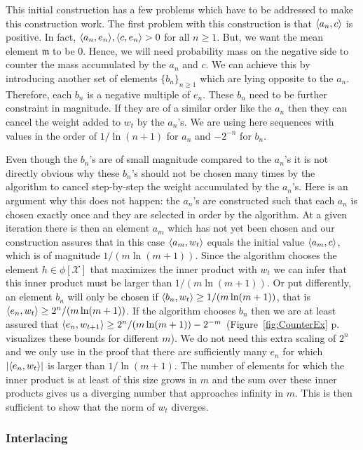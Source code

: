\documentclass[10pt]{amsart}
\theoremstyle{definition}\newtheorem{defi}[theo]{Definition}\newtheorem{rema}[theo]{Remark}\newtheorem{exam}[theo]{Example}\newtheorem{exem}[theo]{Example}\newtheorem{nota}[theo]{Notation}
\theoremstyle{remark}
\newcommand{\X}{\mathcal{X}}
\newcommand{\mean}{\mathfrak{m}}
\providecommand{\abs}[1]{\left\lvert#1\right\rvert}
\providecommand{\inner}[2]{\left\langle #1,#2\right\rangle}
\let\originalleft\left
\let\originalright\right
\renewcommand{\left}{\mathopen{}\mathclose\bgroup\originalleft}
\renewcommand{\right}{\aftergroup\egroup\originalright}
\newcounter{setofstep}
\newcounter{step}[setofstep]
\begin{document}
This initial construction has a few problems which have to be addressed to make this construction work. The first problem with this construction is that $\inner{a_n}{c}$ is positive. In fact, $\inner{a_n}{e_n}, \inner{c}{e_n} > 0$ for all $n\geq 1$. But, we want the mean element $\mean$ to be $0$. Hence, we will need probability mass on the negative side to counter the mass accumulated by the $a_n$ and $c$. We can achieve this by introducing another set of elements $\{b_n\}_{n\geq 1}$ which are lying opposite to the $a_n$. Therefore, each $b_n$ is a negative multiple of $e_n$. These $b_n$ need to be further constraint in magnitude. If they are of a similar order like the $a_n$ then they can cancel the weight added to $w_t$ by the $a_n$'s. We are using here sequences with values in the order of $1/\ln(n+1)$ for $a_n$ and $-2^{-n}$ for $b_n$.

Even though the $b_n$'s are of small magnitude compared to the $a_n$'s it is not directly obvious why these $b_n$'s should not be chosen many times by the algorithm to cancel step-by-step the weight accumulated by the $a_n$'s. Here is an argument why this does not happen: the $a_n$'s are constructed such that each $a_n$ is chosen exactly once and they are selected in order by the algorithm. At a given iteration there is then an element $a_m$ which has not yet been chosen and our construction assures that in this case $\inner{a_m}{w_t}$ equals the initial value $\inner{a_m}{c}$, which is of magnitude $1/(m\ln(m+1))$. Since the algorithm chooses the element $h \in \phi[\X]$ that maximizes the inner product with $w_t$ we can infer that this inner product must be larger than $1/(m\ln(m+1))$. Or put differently, an element $b_n$ will only be chosen if $\inner{b_n}{w_t} \geq 1/(m\ln(m+1))$, that is $\inner{e_n}{w_t} \geq 2^{n}/(m\ln(m+1))$. If the algorithm chooses $b_n$ then we are at least assured that $\inner{e_n}{w_{t+1}} \geq 2^{n}/(m\ln(m+1)) - 2^{-m}$ (Figure~\ref{fig:CounterEx} p.~\pageref{fig:CounterEx} visualizes these bounds for different $m$). We do not need this extra scaling of $2^n$ and we only use in the proof that there are sufficiently many $e_n$ for which $\abs{\inner{e_n}{w_t}}$ is larger than $1/\ln(m+1)$. The number of elements for which the inner product is at least of this size grows in $m$ and the sum over these inner products gives us a diverging number that approaches infinity in $m$. This is then sufficient to show that the norm of $w_t$ diverges.

\subsubsection*{Interlacing}
\end{document}
